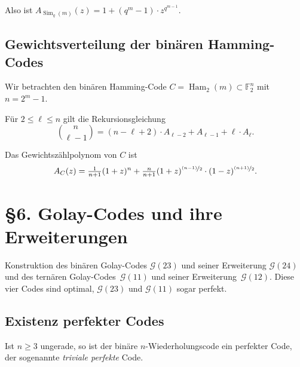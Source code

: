 \documentclass{cheat-sheet}
\newcommand{\F}{\mathbb{F}} %
\DeclareMathOperator{\Ham}{Ham} %
\DeclareMathOperator{\Sim}{Sim} %
\newcommand{\Golay}{\mathcal{G}} %
\begin{document}
\begin{samepage}

\begin{bem}
  Also ist $A_{\Sim_q(m)}(z) = 1 + (q^m - 1) \cdot z^{q^{m-1}}$.
\end{bem}

\subsection{Gewichtsverteilung der binären Hamming-Codes}

Wir betrachten den binären Hamming-Code $C = \Ham_2(m) \subset \F_2^n$ mit $n = 2^m - 1$.

\begin{lem}
  Für $2 \leq \ell \leq n$ gilt die Rekursionsgleichung
  \[
    \binom{n}{\ell-1} = (n-\ell+2) \cdot A_{\ell-2} + A_{\ell-1} + \ell \cdot A_\ell.
  \]
\end{lem}

\begin{satz}
  Das Gewichtszählpolynom von $C$ ist
  \[
    A_C(z) = \tfrac{1}{n+1} (1+z)^n + \tfrac{n}{n+1} (1+z)^{\nicefrac{(n-1)}{2}} \cdot (1-z)^{\nicefrac{(n+1)}{2}}.
  \]
\end{satz}


\section{§6. Golay-Codes und ihre Erweiterungen}

\begin{ziel}
  Konstruktion des binären Golay-Codes $\Golay(23)$ und seiner Erweiterung $\Golay(24)$ und des ternären Golay-Codes~$\Golay(11)$ und seiner Erweiterung~$\Golay(12)$.
  Diese vier Codes sind optimal, $\Golay(23)$ und $\Golay(11)$ sogar perfekt.
\end{ziel}

\subsection{Existenz perfekter Codes}

\end{samepage}

\begin{prop}
  Ist $n \geq 3$ ungerade, so ist der binäre $n$-Wiederholungscode ein perfekter Code, der sogenannte \emph{triviale perfekte} Code.
\end{prop}
\end{document}
